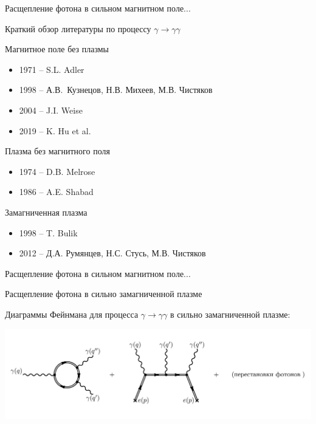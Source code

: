 \documentclass{beamer}
\begin{document}
\begin{frame}{Расщепление фотона в сильном магнитном поле...}
\begin{center}
Краткий обзор литературы по процессу $\gamma\to \gamma\gamma$

Магнитное поле без плазмы

\begin{itemize}
\item 1971 -- S.L. Adler
\item 1998 -- А.В.~Кузнецов, Н.В. Михеев, М.В. Чистяков
\item 2004 -- J.I. Weise
\item 2019 -- K. Hu et al.
\end{itemize}

Плазма без магнитного поля

\begin{itemize}
\item 1974 -- D.B. Melrose
\item 1986 -- A.E. Shabad
\end{itemize}

Замагниченная плазма

\begin{itemize}
\item 1998 -- T. Bulik
\item 2012 -- Д.А. Румянцев, Н.С. Стусь, М.В. Чистяков
\end{itemize}

\end{center}
\end{frame}
\begin{frame}{Расщепление фотона в сильном магнитном поле...}
\begin{center}
\alert{Расщепление фотона в сильно замагниченной плазме}

\vspace{3mm}

Диаграммы Фейнмана для процесса $\gamma\to\gamma\gamma$ в сильно замагниченной плазме:

\vspace{3mm}

\includegraphics[scale=0.08]{3_2.jpg}
\end{center}
\end{frame}
\end{document}
